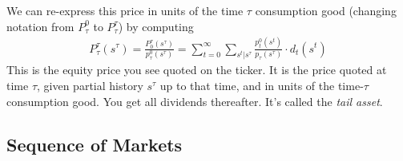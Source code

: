 \documentclass[12pt]{article}
\theoremstyle{plain}
\theoremstyle{definition}
\theoremstyle{remark}
\newcommand{\sumtinfz}{\sum^\infty_{t=0}}
\begin{document}
We can re-express this price in units of the time $\tau$ consumption
good (changing notation from $P^0_\tau$ to $P^\tau_\tau$) by computing
\begin{align*}
  P_\tau^\tau(s^\tau)
  =
  \frac{P_0^\tau(s^\tau)}{p_\tau^0(s^\tau)}
  =
  \sumtinfz \sum_{s^t|s^\tau} \frac{p_t^0(s^t)}{p_\tau(s^\tau)} \cdot d_t(s^t)
\end{align*}
This is the equity price you see quoted on the ticker. It is the price
quoted at time $\tau$, given partial history $s^\tau$ up to that time, and in
units of the time-$\tau$ consumption good. You get all dividends
thereafter. It's called the \emph{tail asset}.

\clearpage
\subsection{Sequence of Markets}
\end{document}
